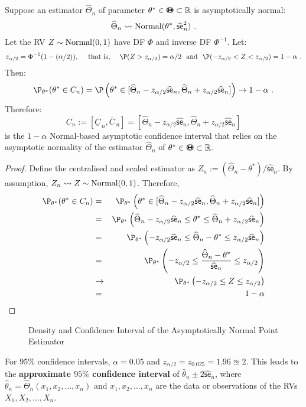 \begin{prop}\label{P:NormalBasedAsympCI}
Suppose an estimator $\widehat{\Theta}_n$ of  parameter $\theta^* \in {\Theta}\mspace{-11 mu}{\Theta} \subset \mathbb{R}$ is asymptotically normal:
\[
\widehat{\Theta}_n \rightsquigarrow \mbox{{\rm Normal}}(\theta^*,\widehat{\mathsf{se}}_n^2) \ .
\]
Let the RV $Z \sim \mbox{{\rm Normal}}(0,1)$ have DF $\Phi$ and inverse DF $\Phi^{-1}$.  Let:
\[
z_{\alpha/2}=\Phi^{-1}(1-(\alpha/2)), \quad \text{ that is, } \quad \P(Z>z_{\alpha/2})=\alpha/2 \ \text{ and } \ \P(-z_{\alpha/2} < Z < z_{\alpha/2}) = 1-\alpha \ .
\]
Then:
\[
\P_{\theta^*}(\theta^* \in C_n)  = \P \left( \theta^* \in [\widehat{\Theta}_n - z_{\alpha/2} \widehat{\mathsf{se}}_n, \widehat{\Theta}_n + z_{\alpha/2} \widehat{\mathsf{se}}_n] \right) \to 1-\alpha \ .
\]
Therefore:
\[
C_n := [\underline{C}_{\, n}, \overline{C}_{\, n}]
= [\widehat{\Theta}_n - z_{\alpha/2} \widehat{\mathsf{se}}_n, \widehat{\Theta}_n + z_{\alpha/2} \widehat{\mathsf{se}}_n]
\] 
is the $1-\alpha$ Normal-based asymptotic confidence interval that relies on the asymptotic normality of the estimator $\widehat{\Theta}_n$ of $\theta^* \in {\Theta}\mspace{-11 mu}{\Theta} \subset \mathbb{R}$.
{\scriptsize
\begin{proof}
Define the centralised and scaled estimator as $Z_n := (\widehat{\Theta}_n-\theta^*)/\widehat{\mathsf{se}}_n$.  By assumption, $Z_n \rightsquigarrow Z \sim \mbox{{\rm Normal}}(0,1)$.  Therefore,
\begin{eqnarray}
\P_{\theta^*}(\theta^* \in C_n) 
&=& \P_{\theta^*} \left( \theta^* \in [\widehat{\Theta}_n - z_{\alpha/2} \widehat{\mathsf{se}}_n, \widehat{\Theta}_n + z_{\alpha/2} \widehat{\mathsf{se}}_n] \right) \notag \\
&=& \P_{\theta^*} \left( \widehat{\Theta}_n - z_{\alpha/2} \widehat{\mathsf{se}}_n \leq \theta^* \leq  \widehat{\Theta}_n + z_{\alpha/2} \widehat{\mathsf{se}}_n \right) \notag \\
&=& \P_{\theta^*} \left(  - z_{\alpha/2} \widehat{\mathsf{se}}_n \leq \widehat{\Theta}_n - \theta^* \leq   z_{\alpha/2} \widehat{\mathsf{se}}_n \right) \notag \\
&=& \P_{\theta^*} \left(  - z_{\alpha/2}  \leq \frac{\widehat{\Theta}_n - \theta^*}{\widehat{\mathsf{se}}_n} \leq   z_{\alpha/2} \right) \notag \\
&\to& \P_{\theta^*} \left(  - z_{\alpha/2}  \leq Z \leq   z_{\alpha/2} \right) \notag \\
&=& 1-\alpha \notag
\end{eqnarray}
\end{proof}
}
\begin{figure}[htb]
\caption{Density and Confidence Interval of the Asymptotically Normal Point Estimator}
\vspace{4cm}
\end{figure}
For $95\%$ confidence intervals, $\alpha=0.05$ and $z_{\alpha/2}=z_{0.025}=1.96\approxeq 2$.  This leads to the {\bf approximate ${95\%}$ confidence interval} of $\widehat{\theta}_n \pm 2 \widehat{\mathsf{se}}_n$, where $\widehat{\theta}_n=\widehat{\Theta}_n(x_1,x_2,\ldots,x_n)$ and $x_1,x_2,\ldots,x_n$ are the data or observations of the RVs $X_1,X_2,\ldots,X_n$.
\end{prop}

